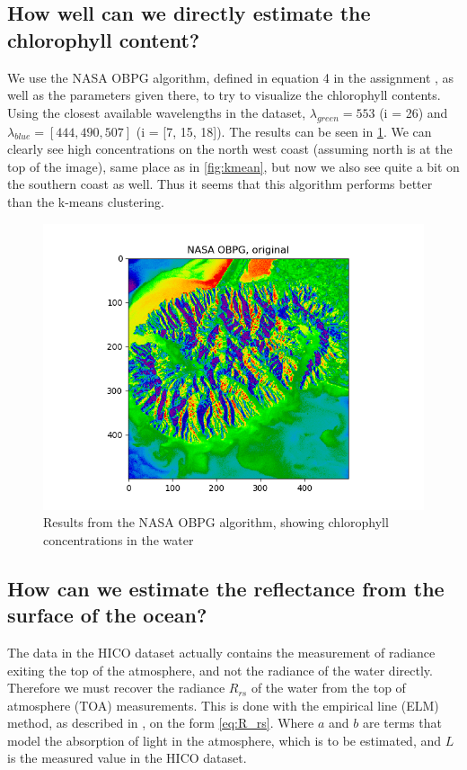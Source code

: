 \subsection{How well can we directly estimate the chlorophyll content?}

We use the NASA OBPG algorithm, defined in equation 4 in the assignment 
\cite{assignment}, as well as the parameters given there, to try to 
visualize the chlorophyll contents. Using the closest available wavelengths 
in the dataset, $\lambda_{green} = 553$ (i = 26) and $\lambda_{blue} = [444, 490, 507]$ 
(i = [7, 15, 18]). The results can be seen in \cref{fig:obpg}. We can clearly 
see high concentrations on the north west coast (assuming north is at the 
top of the image), same place as in \cref{fig:kmean}, but now we also see 
quite a bit on the southern coast as well. Thus it seems that this 
algorithm performs better than the k-means clustering. 

\begin{figure}[h!]
    \centering
    \includegraphics[width=\textwidth]{../fig/NASA OBPG, original.png}
    \caption{Results from the NASA OBPG algorithm, showing chlorophyll concentrations 
    in the water}
    \label{fig:obpg}
\end{figure}

\subsection{How can we estimate the reflectance from the surface of the ocean?}
\label{sec:atmoshperic_cor}

The data in the HICO dataset actually contains the measurement of radiance exiting the top 
of the atmosphere, and not the radiance of the water directly. Therefore we must recover the 
radiance $R_{rs}$ of the water from the top of atmosphere (TOA) measurements. This is done with 
the empirical line (ELM) method, as described in \cite{assignment}, on the form \cref{eq:R_rs}. 
Where $a$ and $b$ are terms that model the absorption of light in the atmosphere, which is to 
be estimated, and $L$ is the measured value in the HICO dataset. 

